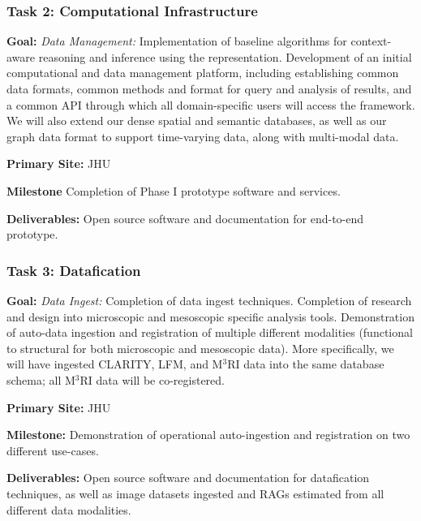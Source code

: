 \subsubsection{Task 2: Computational Infrastructure}
\begin{compactitem}
\item \textbf{Goal:} \emph{Data Management:} Implementation of baseline algorithms for context-aware reasoning and inference using the representation. Development of an initial computational and data management platform, including establishing common data formats, common methods and format for query and analysis of results, and a common API through which all domain-specific users will access the framework. We will also extend our dense spatial and semantic databases, as well as our graph data format to support time-varying data, along with multi-modal data.
\item \textbf{Primary Site:} JHU
\item \textbf{Milestone} Completion of Phase I prototype software and services.
\item \textbf{Deliverables:} Open source software and documentation for end-to-end prototype.
\end{compactitem}



\subsubsection{Task 3: Datafication}
\begin{compactitem}
\item \textbf{Goal:} \emph{Data Ingest:} Completion of data ingest techniques. Completion of research and design into microscopic and mesoscopic specific analysis tools.  Demonstration of auto-data ingestion and registration of multiple different modalities (functional to structural for both microscopic and mesoscopic data). More specifically, we will have ingested CLARITY, LFM, and M$^3$RI data into the same database schema; all M$^3$RI data will be co-registered.
\item \textbf{Primary Site:} JHU
\item \textbf{Milestone:} Demonstration of operational auto-ingestion and registration on two different use-cases.
\item \textbf{Deliverables:} Open source software and documentation for datafication techniques, as well as image datasets ingested and RAGs estimated from all different data modalities.
\end{compactitem}



